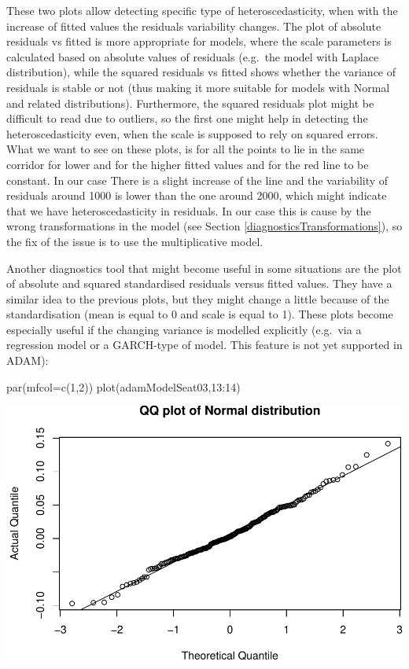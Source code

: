 \documentclass[
]{book}
\newenvironment{Shaded}{\begin{snugshade}}{\end{snugshade}}
\newcommand{\AttributeTok}[1]{\textcolor[rgb]{0.77,0.63,0.00}{#1}}
\newcommand{\DecValTok}[1]{\textcolor[rgb]{0.00,0.00,0.81}{#1}}
\newcommand{\FunctionTok}[1]{\textcolor[rgb]{0.00,0.00,0.00}{#1}}
\newcommand{\NormalTok}[1]{#1}
\newcommand{\SpecialCharTok}[1]{\textcolor[rgb]{0.00,0.00,0.00}{#1}}
\theoremstyle{definition}
\theoremstyle{definition}
\theoremstyle{definition}
\theoremstyle{definition}
\theoremstyle{remark}
\begin{document}
These two plots allow detecting specific type of heteroscedasticity, when with the increase of fitted values the residuals variability changes. The plot of absolute residuals vs fitted is more appropriate for models, where the scale parameters is calculated based on absolute values of residuals (e.g.~the model with Laplace distribution), while the squared residuals vs fitted shows whether the variance of residuals is stable or not (thus making it more suitable for models with Normal and related distributions). Furthermore, the squared residuals plot might be difficult to read due to outliers, so the first one might help in detecting the heteroscedasticity even, when the scale is supposed to rely on squared errors. What we want to see on these plots, is for all the points to lie in the same corridor for lower and for the higher fitted values and for the red line to be constant. In our case There is a slight increase of the line and the variability of residuals around 1000 is lower than the one around 2000, which might indicate that we have heteroscedasticity in residuals. In our case this is cause by the wrong transformations in the model (see Section \ref{diagnosticsTransformations}), so the fix of the issue is to use the multiplicative model.

Another diagnostics tool that might become useful in some situations are the plot of absolute and squared standardised residuals versus fitted values. They have a similar idea to the previous plots, but they might change a little because of the standardisation (mean is equal to 0 and scale is equal to 1). These plots become especially useful if the changing variance is modelled explicitly (e.g.~via a regression model or a GARCH-type of model. This feature is not yet supported in ADAM):

\begin{Shaded}
\begin{Highlighting}[]
\FunctionTok{par}\NormalTok{(}\AttributeTok{mfcol=}\FunctionTok{c}\NormalTok{(}\DecValTok{1}\NormalTok{,}\DecValTok{2}\NormalTok{))}
\FunctionTok{plot}\NormalTok{(adamModelSeat03,}\DecValTok{13}\SpecialCharTok{:}\DecValTok{14}\NormalTok{)}
\end{Highlighting}
\end{Shaded}

\includegraphics{adam_files/figure-latex/unnamed-chunk-162-1.pdf}
\end{document}
